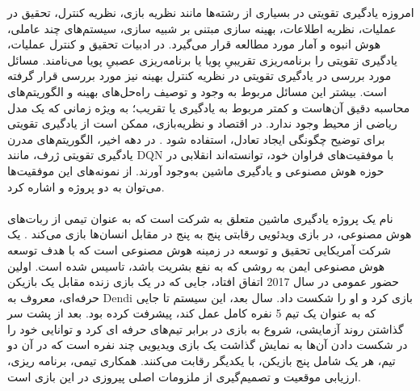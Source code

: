 امروزه یادگیری تقویتی
در بسیاری از رشته‌ها مانند نظریه بازی، نظریه کنترل، تحقیق در عملیات، نظریه اطلاعات، بهینه سازی مبتنی بر شبیه سازی، سیستم‌های چند عاملی، هوش انبوه و آمار مورد مطالعه قرار می‌گیرد. در ادبیات تحقیق و کنترل عملیات، یادگیری تقویتی را برنامه‌ریزی تقریبیِ پویا
  یا برنامه‌ریزی عصبیِ پویا
       می‌نامند. مسائل مورد بررسی در یادگیری تقویتی در نظریه کنترل بهینه
         نیز مورد بررسی قرار گرفته است. بیشتر این مسائل مربوط به وجود و توصیف راه‌حل‌های بهینه و الگوریتم‌های محاسبه دقیق آن‌هاست و کمتر مربوط به یادگیری یا تقریب؛ به ویژه زمانی که یک مدل ریاضی از محیط وجود ندارد. در اقتصاد و نظریه‌بازی، ممکن است از یادگیری تقویتی برای توضیح چگونگی ایجاد تعادل، استفاده شود
\cite{suttonbook}.
در دهه اخیر، الگوریتم‌های مدرن یادگیری تقویتی ژرف، مانند DQN با موفقیت‌های فراوان خود، توانسته‌اند انقلابی در حوزه هوش مصنوعی و یادگیری ماشین به‌وجود آورند. از نمونه‌های این موفقیت‌ها می‌توان به دو پروژه
 و
   اشاره کرد.
\paragraph{}  
   نام یک پروژه یادگیری ماشین متعلق به شرکت 
   است که به عنوان تیمی از ربات‌های هوش مصنوعی، در بازی ویدئویی رقابتی پنج به پنج 
     در مقابل انسان‌ها بازی می‌کند
\cite{raiman2019long, berner2019dota}.
 یک شرکت آمریکایی تحقیق و توسعه در زمینه هوش مصنوعی است که با هدف توسعه هوش مصنوعی ایمن به روشی که به نفع بشریت باشد، تاسیس شده است. اولین حضور عمومی
  در سال 2017 اتفاق افتاد، جایی که در یک بازی زنده مقابل یک بازیکن حرفه‌ای، معروف به Dendi بازی کرد و او را شکست داد. سال بعد، این سیستم تا جایی که به عنوان یک تیم 5 نفره کامل عمل کند، پیشرفت کرده بود. 
  بعد از پشت سر گذاشتن روند آزمایشی، شروع به بازی در برابر تیم‌های حرفه ای کرد و توانایی خود را در شکست دادن آن‌ها به نمایش گذاشت
  یک بازی ویدیویی چند نفره است که در آن دو تیم، هر یک شامل پنج بازیکن، با یکدیگر رقابت می‌کنند. همکاری تیمی، برنامه ریزی، ارزیابی موقعیت و تصمیم‌گیری از ملزومات اصلی پیروزی در این بازی است.

   
   
   

%
  

